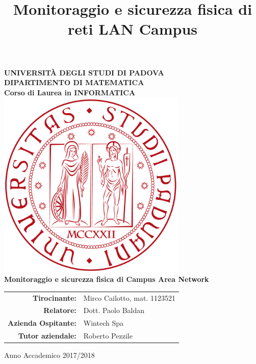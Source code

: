 \documentclass[openany, a4paper, 12pt]{report}
\title{Monitoraggio e sicurezza fisica di reti LAN Campus}
\begin{document}
\begin{titlepage}
	\centering
	\vfill
	{
		\bfseries
		\Large{UNIVERSITÀ DEGLI STUDI DI PADOVA}\\
		\large DIPARTIMENTO DI MATEMATICA\\
		\noindent\makebox[\linewidth]{\rule{16cm}{0.4pt}}
		Corso di Laurea in INFORMATICA
		\vskip1cm
		\includegraphics[width=9cm]{images/LogoPadova} \\
		\vfill
		\LARGE Monitoraggio e sicurezza fisica di Campus Area Network
		\vfill

		\begin{table}[htbp]
			\centering
			\renewcommand\arraystretch{1.2}
			\begin{tabular}{r|l}
				\textbf{Tirocinante:} & Mirco Cailotto, mat. 1123521 \\
				\textbf{Relatore:} & Dott. Paolo Baldan \\
				\textbf{Azienda Ospitante:}	& Wintech Spa \\
				\textbf{Tutor aziendale:} & Roberto Pezzile \\
			\end{tabular}
		\end{table}
		
		\vfill
		\noindent\makebox[\linewidth]{\rule{16cm}{0.4pt}}
		\large Anno Accademico 2017/2018
		\vfill
	}    
\end{titlepage}
\clearpage\thispagestyle{empty}\mbox{}\clearpage

\clearpage\thispagestyle{empty}\mbox{}\clearpage
{}
\tableofcontents
\listoffigures
\listoftables

\newpage
\clearpage\thispagestyle{empty}\mbox{}\clearpage
{}

\clearpage\thispagestyle{empty}\mbox{}\clearpage
{}





\clearpage\thispagestyle{empty}\mbox{}\clearpage

\renewcommand{\leftmark}{Appendici}


\renewcommand{\leftmark}{Glossario}
\printglossaries{}

\newpage


\renewcommand{\leftmark}{Bibliografia}
\end{document}

